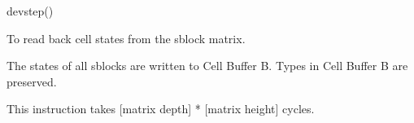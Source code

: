 

\format

devstep()

\purpose

To read back cell states from the sblock matrix.

\description

The states of all sblocks are written to Cell Buffer B.
Types in Cell Buffer B are preserved.

\notes

This instruction takes [matrix depth] * [matrix height] cycles.
